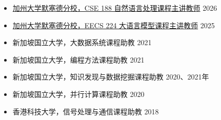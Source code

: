 \begin{itemize}
  \item \href{https://wangywust.github.io/nlp-course-2026}{加州大学默塞德分校，CSE 188 自然语言处理课程主讲教师} \hfill 2026
  \item \href{https://wangywust.github.io/llm-course-2025}{加州大学默塞德分校，EECS 224 大语言模型课程主讲教师} \hfill 2025
  \item 新加坡国立大学，大数据系统课程助教 \hfill 2021
  \item 新加坡国立大学，编程方法课程助教 \hfill 2021
  \item 新加坡国立大学，知识发现与数据挖掘课程助教 \hfill 2020、2021年
  \item 新加坡国立大学，并行计算课程助教 \hfill 2020
  \item 香港科技大学，信号处理与通信课程助教 \hfill 2018
\end{itemize}

